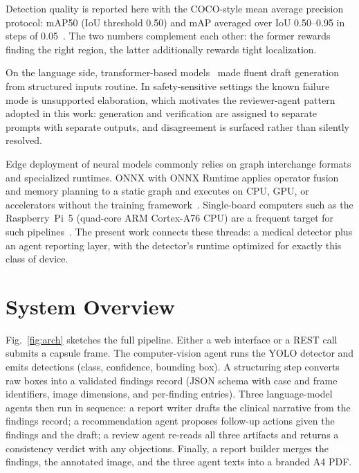 \documentclass[conference]{IEEEtran}
\begin{document}
Detection quality is reported here with the COCO-style mean average precision
protocol: mAP50 (IoU threshold 0.50) and mAP averaged over IoU 0.50--0.95 in
steps of 0.05~\cite{coco2014}. The two numbers complement each other: the
former rewards finding the right region, the latter additionally rewards tight
localization.

On the language side, transformer-based models~\cite{transformer2017} made
fluent draft generation from structured inputs routine. In safety-sensitive
settings the known failure mode is unsupported elaboration, which motivates
the reviewer-agent pattern adopted in this work: generation and verification
are assigned to separate prompts with separate outputs, and disagreement is
surfaced rather than silently resolved.

Edge deployment of neural models commonly relies on graph interchange formats
and specialized runtimes. ONNX with ONNX Runtime applies operator fusion and
memory planning to a static graph and executes on CPU, GPU, or accelerators
without the training framework~\cite{onnxrt}. Single-board computers such as
the Raspberry~Pi~5 (quad-core ARM Cortex-A76 CPU) are a frequent target for
such pipelines~\cite{rpi5}. The present work connects these threads: a medical
detector plus an agent reporting layer, with the detector's runtime optimized
for exactly this class of device.

\section{System Overview}
\label{sec:system}

Fig.~\ref{fig:arch} sketches the full pipeline. Either a web interface or a
REST call submits a capsule frame. The computer-vision agent runs the YOLO
detector and emits detections (class, confidence, bounding box). A structuring
step converts raw boxes into a validated findings record (JSON schema with
case and frame identifiers, image dimensions, and per-finding entries). Three
language-model agents then run in sequence: a report writer drafts the
clinical narrative from the findings record; a recommendation agent proposes
follow-up actions given the findings and the draft; a review agent re-reads
all three artifacts and returns a consistency verdict with any objections.
Finally, a report builder merges the findings, the annotated image, and the
three agent texts into a branded A4 PDF.
\end{document}
